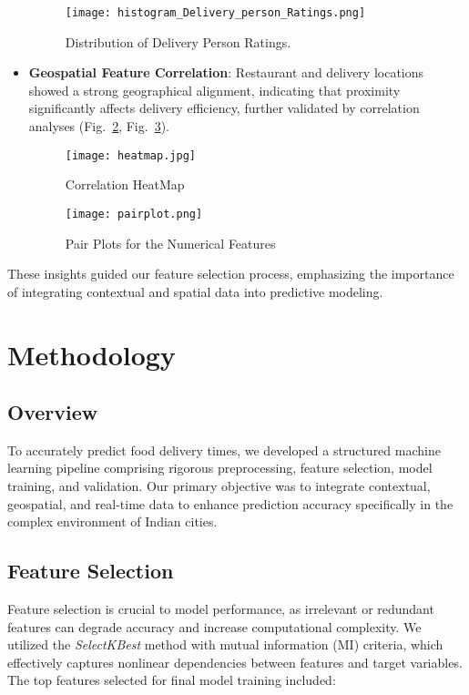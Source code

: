 \documentclass[10pt,twocolumn,letterpaper]{article}
\begin{document}
\begin{itemize}
    \begin{figure}[ht]
        \centering
        \texttt{[image: histogram\_Delivery\_person\_Ratings.png]}
        \caption{Distribution of Delivery Person Ratings.}
        \label{fig:delivery_ratings}
    \end{figure}

    \item \textbf{Geospatial Feature Correlation}: Restaurant and delivery locations showed a strong geographical alignment, indicating that proximity significantly affects delivery efficiency, further validated by correlation analyses (Fig.~\ref{fig:heatmap}, Fig.~\ref{fig:pairplot}).

    \begin{figure}[ht]
        \centering
        \texttt{[image: heatmap.jpg]}
        \caption{Correlation HeatMap}
        \label{fig:heatmap}
    \end{figure}

    \begin{figure}[ht]
        \centering
        \texttt{[image: pairplot.png]}
        \caption{Pair Plots for the Numerical Features}
        \label{fig:pairplot}
    \end{figure}

\end{itemize}

These insights guided our feature selection process, emphasizing the importance of integrating contextual and spatial data into predictive modeling.

\section{Methodology}

\subsection{Overview}
To accurately predict food delivery times, we developed a structured machine learning pipeline comprising rigorous preprocessing, feature selection, model training, and validation. Our primary objective was to integrate contextual, geospatial, and real-time data to enhance prediction accuracy specifically in the complex environment of Indian cities.

\subsection{Feature Selection}
Feature selection is crucial to model performance, as irrelevant or redundant features can degrade accuracy and increase computational complexity. We utilized the \textit{SelectKBest} method with mutual information (MI) criteria, which effectively captures nonlinear dependencies between features and target variables. The top features selected for final model training included:
\end{document}
